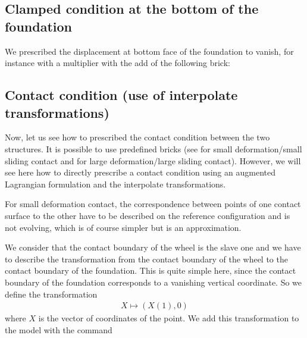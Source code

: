 \documentclass[a4paper,11pt,english]{sphinxmanual}
\begin{document}
\subsection{Clamped condition at the bottom of the foundation}
\label{\detokenize{tutorial/wheel:clamped-condition-at-the-bottom-of-the-foundation}}
\sphinxAtStartPar
We prescribed the displacement at  bottom face of the foundation to vanish, for instance with a multiplier with the add of the following brick:

\begin{sphinxVerbatim}[commandchars=\\\{\}]
   
\end{sphinxVerbatim}


\subsection{Contact condition (use of interpolate transformations)}
\label{\detokenize{tutorial/wheel:contact-condition-use-of-interpolate-transformations}}
\sphinxAtStartPar
Now, let us see how to prescribed the contact condition between the two structures. It is possible to use predefined bricks (see   for small deformation/small sliding contact and  for large deformation/large sliding contact). However, we will see here how to directly prescribe a contact condition using an augmented Lagrangian formulation and the interpolate transformations.

\sphinxAtStartPar
For small deformation contact, the correspondence between points of one contact surface to the other have to be described on the reference configuration and is not evolving, which is of course simpler but is an approximation.

\sphinxAtStartPar
We consider that the contact boundary of the wheel is the slave one and we have to describe the transformation from the contact boundary of the wheel to the contact boundary of the foundation. This is quite simple here, since the contact boundary of the foundation corresponds to a vanishing vertical coordinate. So we define the transformation
\begin{equation*}
\begin{split}X \longmapsto (X(1), 0)\end{split}
\end{equation*}
\sphinxAtStartPar
where \(X\) is the vector of coordinates of the point. We add this transformation to the model with the command
\end{document}
